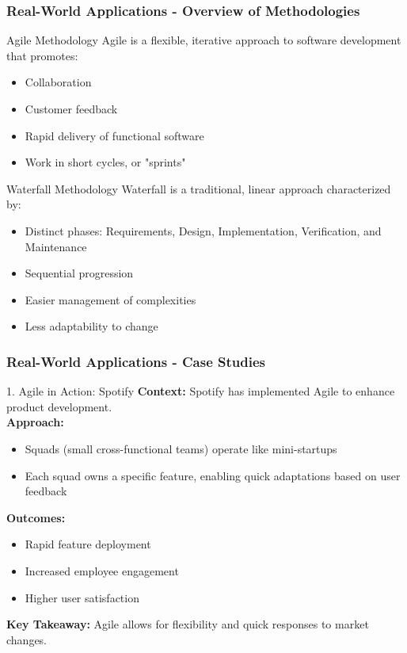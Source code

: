 \documentclass{beamer}
\begin{document}
\begin{frame}[fragile]
    \frametitle{Real-World Applications - Overview of Methodologies}
    \begin{block}{Agile Methodology}
        Agile is a flexible, iterative approach to software development that promotes:
        \begin{itemize}
            \item Collaboration
            \item Customer feedback
            \item Rapid delivery of functional software
            \item Work in short cycles, or "sprints"
        \end{itemize}
    \end{block}

    \begin{block}{Waterfall Methodology}
        Waterfall is a traditional, linear approach characterized by:
        \begin{itemize}
            \item Distinct phases: Requirements, Design, Implementation, Verification, and Maintenance
            \item Sequential progression
            \item Easier management of complexities
            \item Less adaptability to change
        \end{itemize}
\end{block}
\end{frame}

\begin{frame}[fragile]
    \frametitle{Real-World Applications - Case Studies}
    \begin{block}{1. Agile in Action: Spotify}
        \textbf{Context:} Spotify has implemented Agile to enhance product development.\\
        \textbf{Approach:} 
        \begin{itemize}
            \item Squads (small cross-functional teams) operate like mini-startups
            \item Each squad owns a specific feature, enabling quick adaptations based on user feedback
        \end{itemize}
        \textbf{Outcomes:}
        \begin{itemize}
            \item Rapid feature deployment
            \item Increased employee engagement
            \item Higher user satisfaction
        \end{itemize}
        \textbf{Key Takeaway:} Agile allows for flexibility and quick responses to market changes.
    \end{block}
\end{frame}
\end{document}
